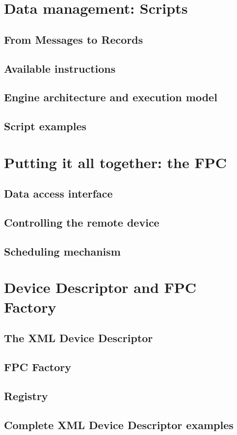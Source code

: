 \section{Data management: Scripts}
\label{sec:components.script}

\subsection{From Messages to Records}

\subsection{Available instructions}

\subsection{Engine architecture and execution model}

\subsection{Script examples}


\section{Putting it all together: the FPC}

\subsection{Data access interface}

\subsection{Controlling the remote device}

\subsection{Scheduling mechanism}


\section{Device Descriptor and FPC Factory}

\subsection{The XML Device Descriptor}

\subsection{FPC Factory}

\subsection{Registry}

\subsection{Complete XML Device Descriptor examples}
